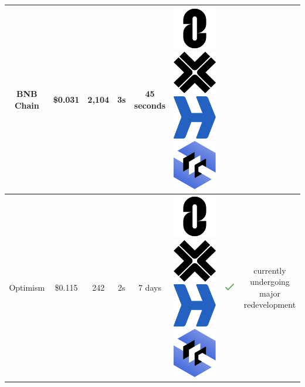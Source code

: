 \documentclass[fleqn,10pt]{olplainarticle}
\begin{document}
\begin{table}[H]
\begin{tabular}{|c|c|c|c|c|c|c|c|}
		BNB Chain & \cellcolor[RGB]{255,200,0}\$0.031 & \cellcolor[RGB]{0,255,0}2,104 & \cellcolor[RGB]{255,150,0}3s  & \cellcolor[RGB]{150,255,100}45 seconds \cite{bnb_chain_coming_nodate} & \includegraphics[width=0.03\linewidth]{img/logoLayerZero} \includegraphics[width=0.03\linewidth]{img/logoAxelar} \includegraphics[width=0.03\linewidth]{img/logoHyperlane} \includegraphics[width=0.03\linewidth]{img/logoCCIP} & & \\ \hline
		
		Optimism &  \cellcolor[RGB]{255,150,0}\$0.115 & \cellcolor[RGB]{255,50,0}242 & \cellcolor[RGB]{130,255,10}2s & \cellcolor[RGB]{255,0,0}7 days\cite{optimism_understanding_nodate}        & \includegraphics[width=0.03\linewidth]{img/logoLayerZero} \includegraphics[width=0.03\linewidth]{img/logoAxelar} \includegraphics[width=0.03\linewidth]{img/logoHyperlane} \includegraphics[width=0.03\linewidth]{img/logoCCIP} & \includegraphics[width=0.03\linewidth]{img/check} & \makecell{currently undergoing \\ major redevelopment\cite{optimism_fault_nodate}} \\ \hline
		

\end{tabular}
\end{table}
\end{document}
